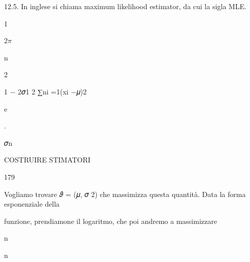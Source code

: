 \documentclass[a4paper,portrait,12pt]{article}
\begin{document}
\begin{flushleft}
12.5. In inglese si chiama maximum likelihood estimator, da cui la sigla MLE.
\end{flushleft}





1


\begin{flushleft}
2$\pi$
\end{flushleft}





\begin{flushleft}
n
\end{flushleft}


2





\begin{flushleft}
1 $-$ 2𝜎1 2 ∑ni =1(xi $-$𝜇)2
\end{flushleft}


\begin{flushleft}
e
\end{flushleft}


.


\begin{flushleft}
𝜎n
\end{flushleft}





\begin{flushleft}
 COSTRUIRE STIMATORI
\end{flushleft}





179





\begin{flushleft}
Vogliamo trovare 𝜗 = (𝜇, 𝜎 2) che massimizza questa quantit\`{a}. Data la forma esponenziale della
\end{flushleft}


\begin{flushleft}
funzione, prendiamone il logaritmo, che poi andremo a massimizzare
\end{flushleft}


\begin{flushleft}
n
\end{flushleft}


\begin{flushleft}
n
\end{flushleft}
\end{document}
